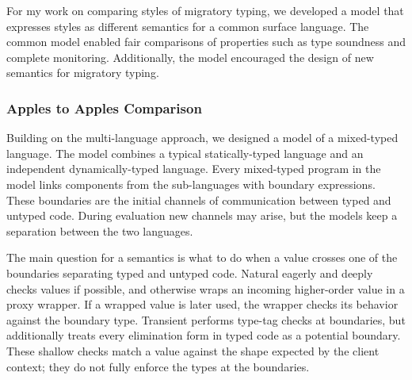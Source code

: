 For my work on comparing styles of migratory typing, we developed
 a model that expresses styles as different semantics
 for a common surface language.
The common model enabled fair comparisons of properties
 such as type soundness and complete monitoring.
Additionally, the model encouraged the design of new semantics for migratory
 typing.

\subsubsection{Apples to Apples Comparison}


Building on the \citet{mf-toplas-2009} multi-language approach, we designed
 a model of a mixed-typed language.
The model combines a typical statically-typed language and an independent
 dynamically-typed language.
Every mixed-typed program in the model links components from the sub-languages
 with boundary expressions.
These boundaries are the initial channels of communication between typed and
 untyped code.
During evaluation new channels may arise, but the models keep a separation
 between the two languages.

The main question for a semantics is what to do when a value crosses one
 of the boundaries separating typed and untyped code.
Natural eagerly and deeply checks values if possible, and otherwise wraps
 an incoming higher-order value in a proxy wrapper.
If a wrapped value is later used, the wrapper checks its behavior against
 the boundary type.
Transient performs type-tag checks at boundaries, but additionally
 treats every elimination form in typed code as a potential boundary.
These shallow checks match a value against the shape expected by the
 client context; they do not fully enforce the types at the boundaries.


